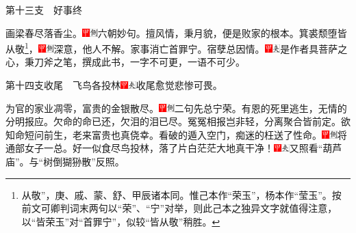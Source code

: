 第十三支　好事终

画梁春尽落香尘。{\includegraphics[width=3mm]{../Images/00002}\includegraphics[width=3mm]{../Images/00011}\footnotesize \kaishu 六朝妙句。}擅风情，秉月貌，便是败家的根本。箕裘颓堕皆从敬\footnote{从敬”，庚、戚、蒙、舒、甲辰诸本同。惟己本作“荣玉”，杨本作“莹玉”。按前文可卿判词末两句以“荣”、“宁”对举，则此己本之独异文字就值得注意，以“皆荣玉”对“首罪宁”，似较“皆从敬”稍胜。}，{\includegraphics[width=3mm]{../Images/00002}\includegraphics[width=3mm]{../Images/00011}\footnotesize \kaishu 深意，他人不解。}家事消亡首罪宁。宿孽总因情。{\includegraphics[width=3mm]{../Images/00002}\includegraphics[width=3mm]{../Images/00012}\footnotesize \kaishu 是作者具菩萨之心，秉刀斧之笔，撰成此书，一字不可更，一语不可少。}

第十四支{收尾}　飞鸟各投林{\includegraphics[width=3mm]{../Images/00002}\includegraphics[width=3mm]{../Images/00012}\footnotesize \kaishu 收尾愈觉悲惨可畏。}

为官的家业凋零，富贵的金银散尽。{\includegraphics[width=3mm]{../Images/00002}\includegraphics[width=3mm]{../Images/00011}\footnotesize \kaishu 二句先总宁荣。}有恩的死里逃生，无情的分明报应。欠命的命已还，欠泪的泪已尽。冤冤相报岂非轻，分离聚合皆前定。欲知命短问前生，老来富贵也真侥幸。看破的遁入空门，痴迷的枉送了性命。{\includegraphics[width=3mm]{../Images/00002}\includegraphics[width=3mm]{../Images/00011}\footnotesize \kaishu 将通部女子一总。}好一似食尽鸟投林，落了片白茫茫大地真干净！{\includegraphics[width=3mm]{../Images/00002}\includegraphics[width=3mm]{../Images/00012}\footnotesize \kaishu 又照看“葫芦庙”。与“树倒猢狲散”反照。}

